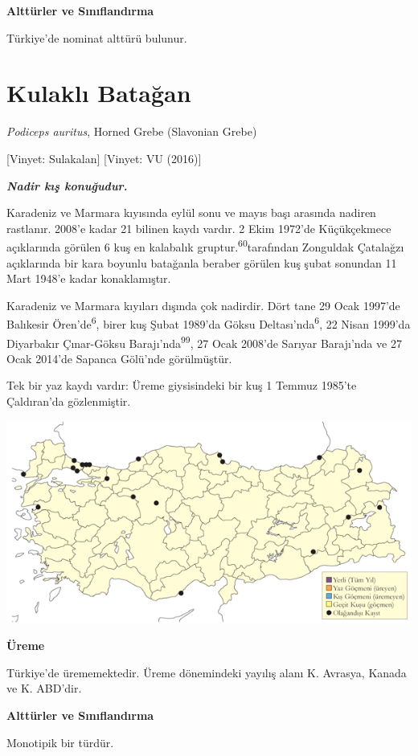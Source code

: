 \documentclass[
  letterpaper,
  DIV=11,
  numbers=noendperiod]{scrreprt}
\begin{document}
\textbf{Alttürler ve Sınıflandırma}

Türkiye'de nominat alttürü bulunur.

\section{Kulaklı Batağan}\label{kulaklux131-bataux11fan}

\emph{Podiceps auritus}, Horned Grebe (Slavonian Grebe)

{[}Vinyet: Sulakalan{]} {[}Vinyet: VU (2016){]}

\textbf{\emph{Nadir kış konuğudur.}}

Karadeniz ve Marmara kıyısında eylül sonu ve mayıs başı arasında nadiren
rastlanır. 2008'e kadar 21 bilinen kaydı vardır. 2 Ekim 1972'de
Küçükçekmece açıklarında görülen 6 kuş en kalabalık
gruptur.\textsuperscript{60}tarafından Zonguldak Çatalağzı açıklarında
bir kara boyunlu batağanla beraber görülen kuş şubat sonundan 11 Mart
1948'e kadar konaklamıştır.

Karadeniz ve Marmara kıyıları dışında çok nadirdir. Dört tane 29 Ocak
1997'de Balıkesir Ören'de\textsuperscript{6}, birer kuş Şubat 1989'da
Göksu Deltası'nda\textsuperscript{6}, 22 Nisan 1999'da Diyarbakır
Çınar-Göksu Barajı'nda\textsuperscript{99}, 27 Ocak 2008'de Sarıyar
Barajı'nda ve 27 Ocak 2014'de Sapanca Gölü'nde görülmüştür.

Tek bir yaz kaydı vardır: Üreme giysisindeki bir kuş 1 Temmuz 1985'te
Çaldıran'da gözlenmiştir.

\includegraphics{images/harita_Page_054.png}

\textbf{Üreme}

Türkiye'de ürememektedir. Üreme dönemindeki yayılış alanı K. Avrasya,
Kanada ve K. ABD'dir.

\textbf{Alttürler ve Sınıflandırma}

Monotipik bir türdür.
\end{document}
